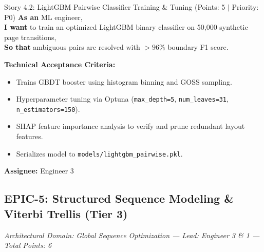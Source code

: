 \documentclass[11pt,a4paper]{article}
\begin{document}
\begin{storybox}{Story 4.2: LightGBM Pairwise Classifier Training \& Tuning (Points: 5 $|$ Priority: P0)}
\textbf{As an} ML engineer, \\
\textbf{I want} to train an optimized LightGBM binary classifier on 50,000 synthetic page transitions, \\
\textbf{So that} ambiguous pairs are resolved with $>96\%$ boundary F1 score.

\vspace{0.3em}
\textbf{Technical Acceptance Criteria:}
\begin{itemize}[leftmargin=1.2em, itemsep=1pt]
    \item Trains GBDT booster using histogram binning and GOSS sampling.
    \item Hyperparameter tuning via Optuna (\texttt{max\_depth=5}, \texttt{num\_leaves=31}, \texttt{n\_estimators=150}).
    \item SHAP feature importance analysis to verify and prune redundant layout features.
    \item Serializes model to \texttt{models/lightgbm\_pairwise.pkl}.
\end{itemize}
\textbf{Assignee:} Engineer 3
\end{storybox}

\clearpage

\subsection{EPIC-5: Structured Sequence Modeling \& Viterbi Trellis (Tier 3)}
\textit{Architectural Domain: Global Sequence Optimization --- Lead: Engineer 3 \& 1 --- Total Points: 6}

\vspace{0.5em}
\end{document}
